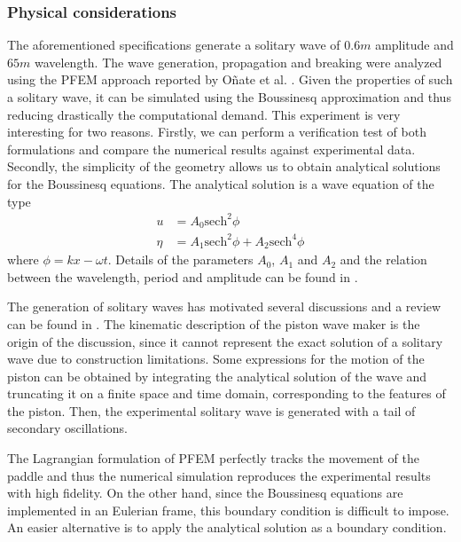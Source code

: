 \subsubsection{Physical considerations}


The aforementioned specifications generate a solitary wave of $0.6m$ amplitude and $65m$ wavelength. The wave generation, propagation and breaking were analyzed using the PFEM approach reported by Oñate et al. \cite{onate2022}.
Given the properties of such a solitary wave, it can be simulated using the Boussinesq approximation and thus reducing drastically the computational demand.
This experiment is very interesting for two reasons. Firstly, we can perform a verification test of both formulations and compare the numerical results against experimental data.
Secondly, the simplicity of the geometry allows us to obtain analytical solutions for the Boussinesq equations.
The analytical solution is a wave equation of the type
\begin{equation*}
\begin{split}
    u &= A_0 \text{sech}^2\phi \\
    \eta &= A_1 \text{sech}^2\phi + A_2 \text{sech}^4\phi
\end{split}
\end{equation*}
where $\phi=kx-\omega t$. Details of the parameters $A_0$, $A_1$ and $A_2$ and the relation between the wavelength, period and amplitude can be found in \cite{wei1995}.


The generation of solitary waves has motivated several discussions and a review can be found in \cite{guizien2010}.
The kinematic description of the piston wave maker is the origin of the discussion, since it cannot represent the exact solution of a solitary wave due to construction limitations.
Some expressions for the motion of the piston can be obtained by integrating the analytical solution of the wave and truncating it on a finite space and time domain, corresponding to the features of the piston. Then, the experimental solitary wave is generated with a tail of secondary oscillations.

The Lagrangian formulation of PFEM perfectly tracks the movement of the paddle and thus the numerical simulation reproduces the experimental results with high fidelity. On the other hand, since the Boussinesq equations are implemented in an Eulerian frame, this boundary condition is difficult to impose. An easier alternative is to apply the analytical solution as a boundary condition.

